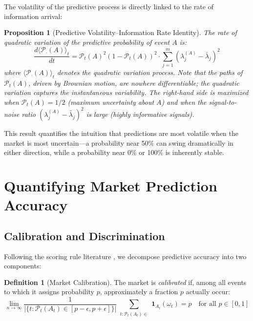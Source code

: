 \documentclass[12pt,a4paper]{article}
\newtheorem{proposition}[theorem]{Proposition}
\theoremstyle{definition}
\newtheorem{definition}[theorem]{Definition}
\newcommand{\PP}{\mathcal{P}}
\begin{document}
The volatility of the predictive process is directly linked to the rate of information arrival:

\begin{proposition}[Predictive Volatility--Information Rate Identity]\label{prop:pred_vol}
The rate of quadratic variation of the predictive probability of event $A$ is:
\begin{equation}\label{eq:pred_vol_info}
    \frac{d\langle \PP_\cdot(A) \rangle_t}{dt} = \PP_t(A)^2(1 - \PP_t(A))^2 \cdot \sum_{j=1}^m (\lambda_j^{(A)} - \bar{\lambda}_j)^2
\end{equation}
where $\langle \PP_\cdot(A) \rangle_t$ denotes the quadratic variation process. Note that the paths of $\PP_t(A)$, driven by Brownian motion, are nowhere differentiable; the quadratic variation captures the instantaneous variability. The right-hand side is maximized when $\PP_t(A) = 1/2$ (maximum uncertainty about $A$) and when the signal-to-noise ratio $(\lambda_j^{(A)} - \bar{\lambda}_j)^2$ is large (highly informative signals).
\end{proposition}

This result quantifies the intuition that predictions are most volatile when the market is most uncertain---a probability near 50\% can swing dramatically in either direction, while a probability near 0\% or 100\% is inherently stable.



\section{Quantifying Market Prediction Accuracy}\label{sec:accuracy}

\subsection{Calibration and Discrimination}

Following the scoring rule literature \citep{gneiting2007}, we decompose predictive accuracy into two components:

\begin{definition}[Market Calibration]\label{def:calibration}
The market is \emph{calibrated} if, among all events to which it assigns probability $p$, approximately a fraction $p$ actually occur:
\begin{equation}\label{eq:calibration}
    \lim_{n \to \infty} \frac{1}{|\{t : \PP_t(A_t) \in [p - \epsilon, p + \epsilon]\}|} \sum_{\substack{t : \PP_t(A_t) \in \\ [p - \epsilon, p + \epsilon]}} \mathbf{1}_{A_t}(\omega_t) = p \quad \text{for all } p \in [0,1]
\end{equation}
\end{definition}
\end{document}
